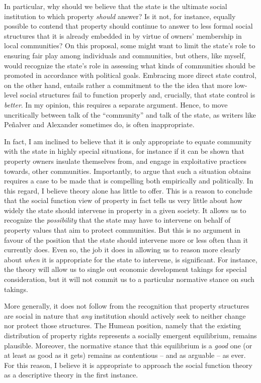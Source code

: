 In particular, why should we believe that the state is the ultimate social institution to which property {\it should} answer? Is it not, for instance, equally possible to contend that property should continue to answer to less formal social structures that it is already embedded in by virtue of owners' membership in local communities? On this proposal, some might want to limit the state's role to ensuring fair play among individuals and communities, but others, like myself, would recognize the state's role in assessing what kinds of communities should be promoted in accordance with political goals. Embracing more direct state control, on the other hand, entails rather a commitment to the the idea that more low-level social structures fail to function properly and, crucially, that state control is {\it better}. In my opinion, this requires a separate argument. Hence, to move uncritically between talk of the ``community'' and talk of the state, as writers like Pe\~{n}alver and Alexander sometimes do, is often inappropriate.

In fact, I am inclined to believe that it is only appropriate to equate community with the state in highly special situations, for instance if it can be shown that property owners insulate themselves from, and engage in exploitative practices towards, other communities. Importantly, to argue that such a situation obtains requires a case to be made that is compelling both empirically and politically. In this regard, I believe theory alone has little to offer. This is a reason to conclude that the social function view of property in fact tells us very little about how widely the state should intervene in property in a given society. It allows us to recognize the {\it possibility} that the state may have to intervene on behalf of property values that aim to protect communities. But this is no argument in favour of the position that the state should intervene more or less often than it currently does. Even so, the job it does in allowing us to reason more clearly about {\it when} it is appropriate for the state to intervene, is significant. For instance, the theory will allow us to single out economic development takings for special consideration, but it will not commit us to a particular normative stance on such takings.

More generally, it does not follow from the recognition that property structures are social in nature that {\it any} institution should actively seek to neither change nor protect those structures. The Humean position, namely that the existing distribution of property rights represents a socially emergent equilibrium, remains plausible. Moreover, the normative stance that this equilibrium is a {\it good} one (or at least as good as it gets) remains as contentious -- and as arguable -- as ever. For this reason, I believe it is appropriate to approach the social function theory as a descriptive theory in the first instance.

